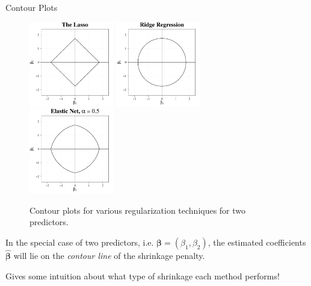 \documentclass[8pt]{beamer}
\newcommand{\mydef}[1]{\textcolor{SteelBlue3}{\textit{#1}}} %
\begin{document}
\begin{frame}{Contour Plots}

\begin{figure}
    \centering
    \includegraphics[width = 0.33\textwidth]{cont_lasso.pdf}
    \includegraphics[width = 0.33\textwidth]{cont_ridge.pdf}
    \includegraphics[width = 0.33\textwidth]{cont_enet.pdf}
    \caption{Contour plots for various regularization techniques for two predictors.}
    \label{mult_cont}
\end{figure} %

In the special case of two predictors, i.e. $\bm{\beta} = (\beta_1,\beta_2)$, the estimated coefficients $\hat{\bm{\beta}}$ will lie on the \mydef{contour line} of the shrinkage penalty. %

Gives some intuition about what type of shrinkage each method performs! %
\Laughey[1.25][yellow][pink]
    
\end{frame}
\end{document}
